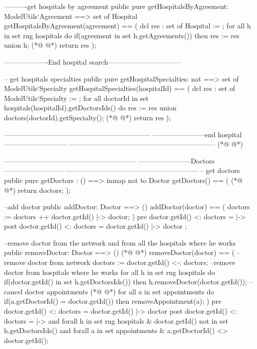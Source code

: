 \begin{vdmpp}[breaklines=true]
  ----------get hospitals by agreement
  public pure getHospitalsByAgreement: ModelUtils`Agreement ==> set of Hospital
   getHospitalsByAgreement(agreement) == (
    dcl res : set of Hospital := {};
    for all h in set rng hospitals do
      if(agreement in set h.getAgreements()) then
       res := res union {h};
(*@
\label{disassociateDoctorFromHospital:131}
@*)
    return res
   );
   
  -------------------End hospital search--------------------------------
    
  -- get hospitals specialties
  public pure getHospitalSpecialties: nat ==> set of ModelUtils`Specialty
   getHospitalSpecialties(hospitalId) == (
    dcl res : set of ModelUtils`Specialty := {};
     for all doctorId in set hospitals(hospitalId).getDoctorsIds() do
       res := res union {doctors(doctorId).getSpecialty()};
(*@
\label{getHospitals:142}
@*)
    return res
   );
   
    
  ---------------------------------------------------------------
  -----------------------end hospital ---------------------------
  ---------------------------------------------------------------
(*@
\label{addHospital:149}
@*)
  
  
  ---------------------------------------------------------
  -----------------------Doctors --------------------------
  ---------------------------------------------------------
  -- get doctors
  public pure getDoctors : () ==> inmap nat to Doctor
  getDoctors() == (
(*@
\label{removeHospital:157}
@*)
   return doctors;
  );
    
  --add doctor
  public addDoctor: Doctor ==> ()
  addDoctor(doctor) == (
   doctors := doctors ++  { doctor.getId() |-> doctor};
  )
  pre {doctor.getId() } <: doctors = { |-> }  
  post {doctor.getId() } <: doctors = { doctor.getId() |-> doctor };
  
  --remove doctor from the network and from all the hospitals where he works
  public removeDoctor: Doctor ==> ()
(*@
\label{addAgreementToHospital:170}
@*)
  removeDoctor(doctor) == (
   --remove doctor from network
   doctors := {doctor.getId()} <-: doctors;
   --remove doctor from hospitals where he works
   for all h in set rng hospitals do 
    if(doctor.getId() in set h.getDoctorsIds()) then
     h.removeDoctor(doctor.getId());
   --cancel doctor appointments
(*@
\label{removeAgreementFromHospital:178}
@*)
   for all a in set appointments do 
    if(a.getDoctorId() = doctor.getId()) then
     removeAppointment(a);
  )
   pre {doctor.getId()} <: doctors = { doctor.getId() |-> doctor } 
  post {doctor.getId()} <: doctors = { |-> } and 
     forall h in set rng hospitals & doctor.getId() not in set h.getDoctorsIds() and 
     forall a in set appointments & a.getDoctorId() <> doctor.getId();
  

\end{vdmpp}
